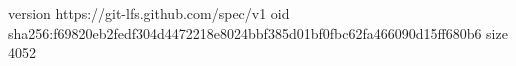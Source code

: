 version https://git-lfs.github.com/spec/v1
oid sha256:f69820eb2fedf304d4472218e8024bbf385d01bf0fbc62fa466090d15ff680b6
size 4052
